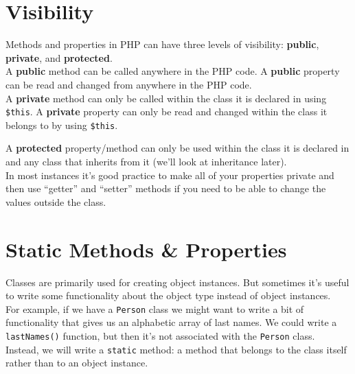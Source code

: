 

\section{Visibility}

Methods and properties in PHP can have three levels of visibility: \textbf{public}, \textbf{private}, and \textbf{protected}.
\\

A \textbf{public} method can be called anywhere in the PHP code. A \textbf{public} property can be read and changed from anywhere in the PHP code.
\\

A \textbf{private} method can only be called within the class it is declared in using \texttt{\$this}. A \textbf{private} property can only be read and changed within the class it belongs to by using \texttt{\$this}.


A \textbf{protected} property/method can only be used within the class it is declared in and any class that inherits from it (we'll look at inheritance later).
\\

In most instances it's good practice to make all of your properties private and then use ``getter'' and ``setter'' methods if you need to be able to change the values outside the class.


\section{Static Methods \& Properties}

Classes are primarily used for creating object instances. But sometimes it's useful to write some functionality about the object type instead of object instances.
\\

For example, if we have a \texttt{Person} class we might want to write a bit of functionality that gives us an alphabetic array of last names. We could write a \texttt{lastNames()} function, but then it's not associated with the \texttt{Person} class.
\\

Instead, we will write a \texttt{static} method: a method that belongs to the class itself rather than to an object instance.


